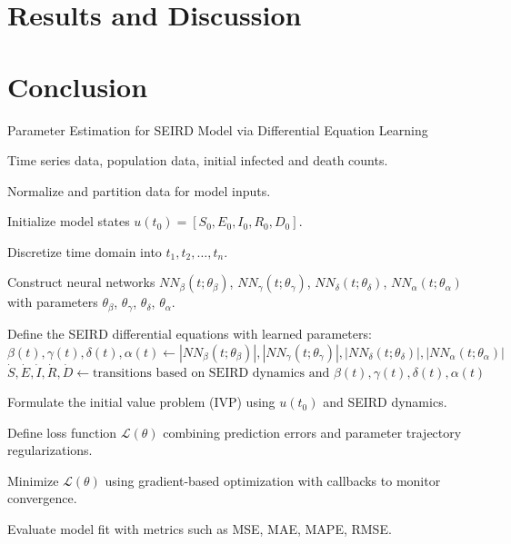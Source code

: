 \documentclass[12pt]{article}
\begin{document}
\section{Results and Discussion}




\section{Conclusion}


\begin{algorithm}
\caption{Parameter Estimation for SEIRD Model via Differential Equation Learning}
\begin{algorithmic}[1]

\Require Time series data, population data, initial infected and death counts.

\State Normalize and partition data for model inputs.

\State Initialize model states $u(t_0) = [S_0, E_0, I_0, R_0, D_0]$.

\State Discretize time domain into $t_1, t_2, \ldots, t_n$.

\State Construct neural networks $NN_{\beta}(t;\theta_{\beta})$, $NN_{\gamma}(t;\theta_{\gamma})$, $NN_{\delta}(t;\theta_{\delta})$, $NN_{\alpha}(t;\theta_{\alpha})$ with parameters $\theta_{\beta}$, $\theta_{\gamma}$, $\theta_{\delta}$, $\theta_{\alpha}$.

\State Define the SEIRD differential equations with learned parameters:
    \State $\beta(t), \gamma(t), \delta(t), \alpha(t) \gets |NN_{\beta}(t;\theta_{\beta})|, |NN_{\gamma}(t;\theta_{\gamma})|, |NN_{\delta}(t;\theta_{\delta})|, |NN_{\alpha}(t;\theta_{\alpha})|$
    \State $\dot{S}, \dot{E}, \dot{I}, \dot{R}, \dot{D} \gets \text{transitions based on SEIRD dynamics and } \beta(t), \gamma(t), \delta(t), \alpha(t)$
\EndFunction

\State Formulate the initial value problem (IVP) using $u(t_0)$ and SEIRD dynamics.

\State Define loss function $\mathcal{L}(\theta)$ combining prediction errors and parameter trajectory regularizations.

\State Minimize $\mathcal{L}(\theta)$ using gradient-based optimization with callbacks to monitor convergence.

\State Evaluate model fit with metrics such as MSE, MAE, MAPE, RMSE.

\end{algorithmic}
\end{algorithm}
\end{document}
